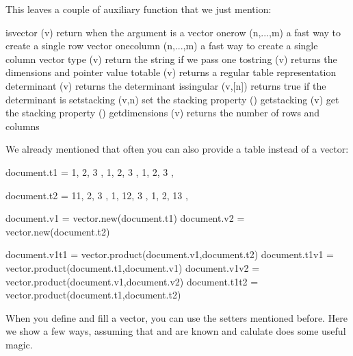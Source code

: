 This leaves a couple of auxiliary function that we just mention:

\starttabulate[|Tl|Tl|l|]
\NC isvector      \NC (v)       \NC return  when the argument is a vector \NC \NR
\NC onerow        \NC (n,...,m) \NC a fast way to create a single row vector \NC \NR
\NC onecolumn     \NC (n,...,m) \NC a fast way to create a single column vector \NC \NR
\NC type          \NC (v)       \NC return the string  if we pass one \NC \NR
\NC tostring      \NC (v)       \NC returns the dimensions and pointer value \NC \NR
\NC totable       \NC (v)       \NC returns a regular table representation \NC \NR
\NC determinant   \NC (v)       \NC returns the determinant \NC \NR
\NC issingular    \NC (v,[n])   \NC returns true if the determinant is  \NC \NR
\NC setstacking   \NC (v,n)     \NC set the stacking property (\METAPOST) \NC \NR
\NC getstacking   \NC (v)       \NC get the stacking property (\METAPOST) \NC \NR
\NC getdimensions \NC (v)       \NC returns the number of rows and columns \NC \NR
\stoptabulate

We already mentioned that often you can also provide a table instead
of a vector:

\startbuffer
\startluacode
document.t1 = {
    { 1, 2, 3 },
    { 1, 2, 3 },
    { 1, 2, 3 },
}

document.t2 = {
    { 11, 2, 3 },
    { 1, 12, 3 },
    { 1, 2, 13 },
}

document.v1 = vector.new(document.t1)
document.v2 = vector.new(document.t2)

document.v1t1 = vector.product(document.v1,document.t2)
document.t1v1 = vector.product(document.t1,document.v1)
document.v1v2 = vector.product(document.v1,document.v2)
document.t1t2 = vector.product(document.t1,document.t2)
\stopluacode
\stopbuffer

\typebuffer[option=TEX] \getbuffer

\startlinecorrection
{} {}
    {} {}
    {} {}
    {} {}
\stopcombination
\stoplinecorrection

When you define and fill a vector, you can use the setters mentioned before. Here
we show a few ways, assuming that  and  are known and \type
{calulate} does some useful magic.

